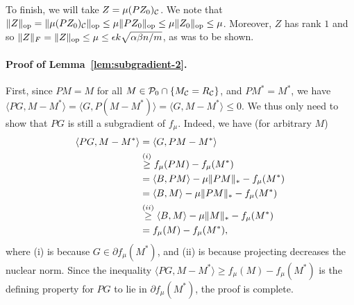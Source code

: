 To finish, we will take $Z = \mu (PZ_0)_{\mathcal{C}}$. We note that
$\|Z\|_{\mathrm{op}} = \|\mu (PZ_0)_{\mathcal{C}}\|_{\mathrm{op}} \leq \mu \|PZ_0\|_{\mathrm{op}} \leq \mu \|Z_0\|_{\mathrm{op}} \leq \mu$.
Moreover, $Z$ has rank $1$ and so $\|Z\|_F = \|Z\|_{\mathrm{op}} \leq \mu \leq \epsilon k\sqrt{\alpha\beta n/m}$, as was to be shown.

\paragraph{Proof of Lemma~\ref{lem:subgradient-2}.}
First, since $PM = M$ for all $M \in \mathcal{P}_0 \cap \{M_{\mathcal{C}} = R_{\mathcal{C}}\}$, and $PM^* = M^*$, 
we have $\langle PG, M-M^* \rangle = \langle G, P(M-M^*) \rangle = \langle G, M-M^* \rangle \leq 0$. 
We thus only need to show that $PG$ is still a subgradient of $f_{\mu}$. Indeed, we have (for arbitrary $M$)
\begin{align}
\langle PG, M-M^* \rangle &= \langle G, PM - M^* \rangle \\
 &\stackrel{(i)}{\geq} f_{\mu}(PM) - f_{\mu}(M^*) \\
 &= \langle B, PM \rangle - \mu \|PM\|_* - f_{\mu}(M^*) \\
 &= \langle B, M \rangle - \mu \|PM\|_* - f_{\mu}(M^*) \\
 &\stackrel{(ii)}{\geq} \langle B, M \rangle - \mu \|M\|_* - f_{\mu}(M^*) \\
 &= f_{\mu}(M) - f_{\mu}(M^*),
\end{align}
where (i) is because $G \in \partial f_{\mu}(M^*)$, and (ii) is because projecting 
decreases the nuclear norm. Since the inequality $\langle PG, M-M^* \rangle \geq f_{\mu}(M) - f_{\mu}(M^*)$ 
is the defining property for $PG$ to lie in $\partial f_{\mu}(M^*)$, the proof is complete.
